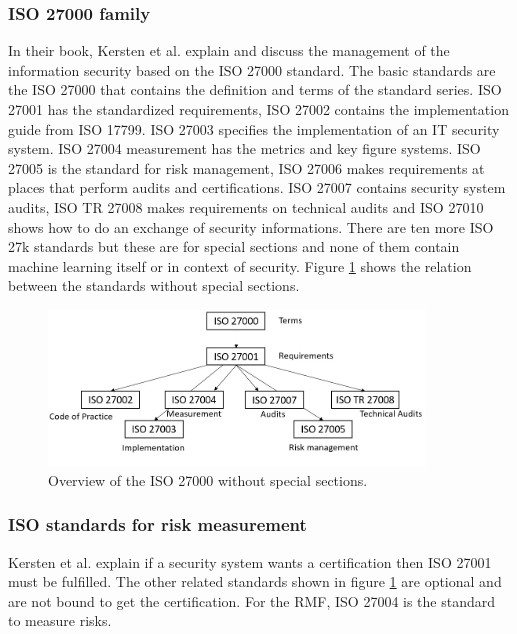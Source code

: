 \subsubsection*{ISO 27000 family}

In their book, Kersten et al. \cite{kersten_reuter_schroeder_wolfenstetter_2013} explain and discuss the management of the information security based on the ISO 27000 standard. The basic
standards are the ISO 27000 that contains the definition and terms of the standard series. ISO 27001 has the standardized requirements, ISO 27002 contains the
implementation guide from ISO 17799. ISO 27003 specifies the implementation of an IT security system. ISO 27004 measurement has the metrics and key figure systems. ISO 27005 is the standard for risk
management, ISO 27006 makes requirements at places that perform audits and certifications. ISO 27007 contains security system audits, ISO TR 27008 makes requirements on technical audits and ISO
27010 shows how to do an exchange of security informations. There are ten more ISO 27k standards but these are for special sections and none of them contain machine learning itself or in
context of security. Figure \ref{fig:standard_relations} shows
the relation between the standards without special sections.

\begin{figure}[ht!]
  \centering
  \includegraphics[width=10cm]{pictures/standard_relations.jpg}
  \caption{Overview of the ISO 27000 without special sections.}
  \label{fig:standard_relations}
\end{figure}


\subsubsection*{ISO standards for risk measurement}

Kersten et al. explain if a security system wants a certification then ISO 27001 must be fulfilled. The other related standards shown in figure \ref{fig:standard_relations} are optional and are not bound to get the certification. For the RMF, ISO 27004 is the standard to measure risks.

